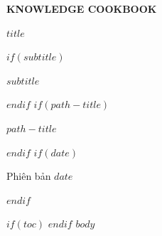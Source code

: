 \documentclass[10pt,b5paper,open=any]{scrbook}
\begin{document}
\frontmatter
\begin{titlepage}
  \pagecolor{BookNavy}\color{white}
  \vspace*{18mm}
  {\sffamily\bfseries\fontsize{11}{13}\selectfont\color{cyan!45} KNOWLEDGE COOKBOOK\par}
  \vspace{14mm}
  {\sffamily\bfseries\fontsize{30}{35}\selectfont $title$\par}
$if(subtitle)$
  \vspace{9mm}
  {\sffamily\fontsize{15}{20}\selectfont\color{white!82} $subtitle$\par}
$endif$
  \vfill
$if(path-title)$
  {\sffamily\color{white!75} $path-title$\par}
$endif$
$if(date)$
  {\sffamily\color{white!75} Phiên bản $date$\par}
$endif$
\end{titlepage}
\nopagecolor\color{black}
$if(toc)$
\tableofcontents
\clearpage
$endif$
\let\cleardoublepage\clearpage
\mainmatter
$body$
\end{document}
